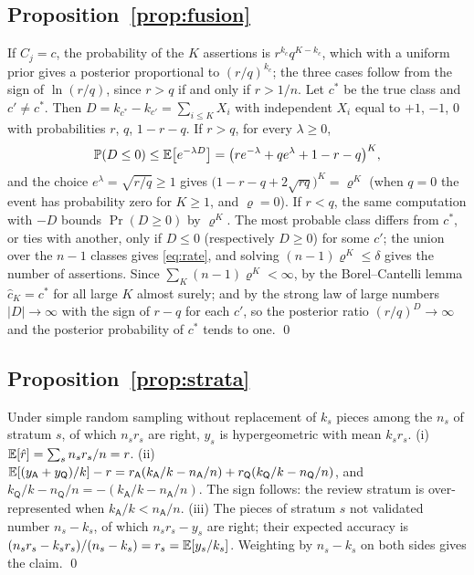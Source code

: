 \subsection*{Proposition~\ref{prop:fusion}}
If $C_j=c$, the probability of the $K$ assertions is $r^{k_c}q^{K-k_c}$, which with a uniform prior gives a
posterior proportional to $(r/q)^{k_c}$; the three cases follow from the sign of $\ln(r/q)$, since $r>q$ if and
only if $r>1/n$. Let $c^\ast$ be the true class and $c'\ne c^\ast$. Then $D=k_{c^\ast}-k_{c'}=\sum_{i\le K}X_i$
with independent $X_i$ equal to $+1$, $-1$, $0$ with probabilities $r$, $q$, $1-r-q$. If $r>q$, for every
$\lambda\ge0$,
\[
\mathbb{P}(D\le0)\le\mathbb{E}\big[e^{-\lambda D}\big]=\big(re^{-\lambda}+qe^{\lambda}+1-r-q\big)^K ,
\]
and the choice $e^{\lambda}=\sqrt{r/q}\ge1$ gives $\big(1-r-q+2\sqrt{rq}\big)^K=\varrho^K$ (when $q=0$ the event
has probability zero for $K\ge1$, and $\varrho=0$). If $r<q$, the same computation with $-D$ bounds $\Pr(D\ge0)$ by
$\varrho^K$. The most probable class differs from $c^\ast$, or ties with another, only if $D\le0$ (respectively
$D\ge0$) for some $c'$; the union over the $n-1$ classes gives \eqref{eq:rate}, and solving
$(n-1)\varrho^K\le\delta$ gives the number of assertions. Since $\sum_K(n-1)\varrho^K<\infty$, by the
Borel--Cantelli lemma $\hat c_K=c^\ast$ for all large $K$ almost surely; and by the strong law of large numbers
$|D|\to\infty$ with the sign of $r-q$ for each $c'$, so the posterior ratio $(r/q)^{D}\to\infty$ and the posterior
probability of $c^\ast$ tends to one. \qed

\subsection*{Proposition~\ref{prop:strata}}
Under simple random sampling without replacement of $k_s$ pieces among the $n_s$ of stratum $s$, of which
$n_sr_s$ are right, $y_s$ is hypergeometric with mean $k_sr_s$. (i) $\mathbb{E}[\hat r]=\sum_sn_sr_s/n=r$. (ii)
$\mathbb{E}[(y_{\mathsf A}+y_{\mathsf Q})/k]-r=r_{\mathsf A}(k_{\mathsf A}/k-n_{\mathsf A}/n)+r_{\mathsf Q}(k_{\mathsf Q}/k-n_{\mathsf Q}/n)$,
and $k_{\mathsf Q}/k-n_{\mathsf Q}/n=-(k_{\mathsf A}/k-n_{\mathsf A}/n)$. The sign follows: the review stratum is
over-represented when $k_{\mathsf A}/k<n_{\mathsf A}/n$. (iii) The pieces of stratum $s$ not validated number
$n_s-k_s$, of which $n_sr_s-y_s$ are right; their expected accuracy is $(n_sr_s-k_sr_s)/(n_s-k_s)=r_s=\mathbb{E}[y_s/k_s]$.
Weighting by $n_s-k_s$ on both sides gives the claim. \qed

